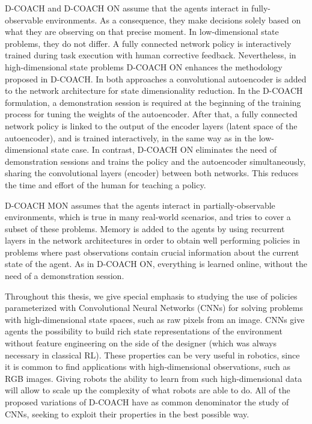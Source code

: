 D-COACH and D-COACH ON assume that the agents interact in fully-observable environments. As a consequence, they make decisions solely based on what they are observing on that precise moment. In low-dimensional state problems, they do not differ. A fully connected network policy is interactively trained during task execution with human corrective feedback. Nevertheless, in high-dimensional state problems D-COACH ON enhances the methodology proposed in D-COACH. In both approaches a convolutional autoencoder is added to the network architecture for state dimensionality reduction. In the D-COACH formulation, a demonstration session is required at the beginning of the training process for tuning the weights of the autoencoder. After that, a fully connected network policy is linked to the output of the encoder layers (latent space of the autoencoder), and is trained interactively, in the same way as in the low-dimensional state case. In contrast, D-COACH ON eliminates the need of demonstration sessions and trains the policy and the autoencoder simultaneously, sharing the convolutional layers (encoder) between both networks. This reduces the time and effort of the human for teaching a policy.

D-COACH MON assumes that the agents interact in partially-observable environments, which is true in many real-world scenarios, and tries to cover a subset of these problems. Memory is added to the agents by using recurrent layers in the network architectures in order to obtain well performing policies in problems where past observations contain crucial information about the current state of the agent. As in D-COACH ON, everything is learned online, without the need of a demonstration session. 

Throughout this thesis, we give special emphasis to studying the use of policies parameterized with Convolutional Neural Networks (CNNs) for solving problems with high-dimensional state spaces, such as raw pixels from an image. CNNs give agents the possibility to build rich state representations of the environment without feature engineering on the side of the designer (which was always necessary in classical RL). These properties can be very useful in robotics, since it is common to find applications with high-dimensional observations, such as RGB images. Giving robots the ability to learn from such high-dimensional data will allow to scale up the complexity of what robots are able to do. All of the proposed variations of D-COACH have as common denominator the study of CNNs,  seeking to exploit their properties in the best possible way. 

